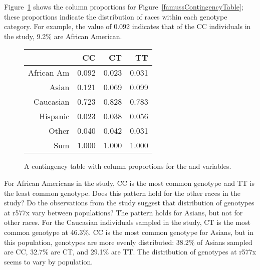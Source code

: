 
Figure~\ref{famussColPropTable} shows the column proportions for Figure~\ref{famussContingencyTable}; these proportions indicate the distribution of races within each genotype category. For example, the value of 0.092 indicates that of the CC individuals in the study, 9.2\% are African American. 


\begin{figure}[ht]
	\centering
	\begin{tabular}{rrrr}
		\hline
		& CC & CT & TT \\ 
		\hline
		African Am & 0.092 & 0.023 & 0.031 \\ 
		Asian & 0.121 & 0.069 & 0.099 \\ 
		Caucasian & 0.723 & 0.828 & 0.783 \\ 
		Hispanic & 0.023 & 0.038 & 0.056 \\ 
		Other & 0.040 & 0.042 & 0.031 \\ 
		Sum & 1.000 & 1.000 & 1.000 \\
		\hline
	\end{tabular}
	\caption{A contingency table with column proportions for the  and  variables.} 
	\label{famussColPropTable}
\end{figure}


\begin{examplewrap}
\begin{nexample}{For African Americans in the study, CC is the most common genotype and TT is the least common genotype. Does this pattern hold for the other races in the study? Do the observations from the study suggest that distribution of genotypes at r577x vary between populations?} 
	The pattern holds for Asians, but not for other races. For the Caucasian individuals sampled in the study, CT is the most common genotype at 46.3\%. CC is the most common genotype for Asians, but in this population, genotypes are more evenly distributed: 38.2\% of Asians sampled are CC, 32.7\% are CT, and 29.1\% are TT. The distribution of genotypes at r577x seems to vary by population.
\end{nexample}
\end{examplewrap}


